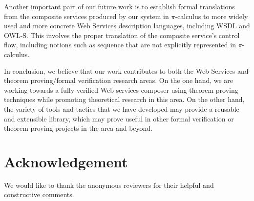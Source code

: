 \documentclass[copyright,creativecommons]{eptcs}
\begin{document}
Another important part of our future work is to establish formal translations from the composite services produced by our system in $\pi$-calculus to more widely used and more concrete Web Services description languages, including WSDL and OWL-S. This involves the proper translation of the composite service's control flow, including notions such as sequence that are not explicitly represented in $\pi$-calculus.

In conclusion, we believe that our work contributes to both the Web Services and theorem proving/formal verification research areas. On the one hand, we are working towards a fully verified Web services composer using theorem proving techniques while promoting theoretical research in this area. On the other hand, the variety of tools and tactics that we have developed may provide a reusable and extensible library, which may prove useful in other formal verification or theorem proving projects in the area and beyond.

\section{Acknowledgement}

We would like to thank the anonymous reviewers for their helpful and constructive comments.




\end{document}
